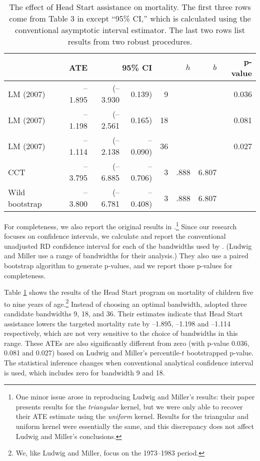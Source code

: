 \documentclass[12pt,fleqn]{article}
\begin{document}
\begin{table}[t]
  \centering
  \begin{tabular}{lrr@{, }rr@{}rrr}
    \toprule
                      & ATE     & \multicolumn{2}{r}{95\% CI}            &     &  $h$ &   $b$ & p-value \\
    \midrule
    LM (2007)         & --1.895 & (--3.930                    & 0.139)   & 9   &      &       & 0.036 \\
    LM (2007)         & --1.198 & (--2.561                    & 0.165)   & 18  &      &       & 0.081 \\
    LM (2007)         & --1.114 & (--2.138                    & --0.090) & 36  &      &       & 0.027 \\
    CCT               & --3.795 & (--6.885                    & --0.706) & 3   & .888 & 6.807 &       \\ 
    Wild bootstrap    & --3.800 & (--6.781                    & --0.408) & 3   & .888 & 6.807 &       \\
    \bottomrule
  \end{tabular}
  \caption{The effect of Head Start assistance on mortality. The first three
    rows come from Table 3 in \cite{ludwig2007} except ``95\% CI,'' which is
    calculated using the conventional asymptotic interval estimator.
    The last two rows list results from two robust procedures.}
  \label{tbl:2}
\end{table}

For completeness, we also report the
original results in \cite{ludwig2007}.\footnote{%
  One minor issue arose in reproducing Ludwig and Miller's results: their paper
  presents results for the \emph{triangular} kernel, but we were only able to
  recover their ATE estimate using the \emph{uniform} kernel. Results for the
  triangular and uniform kernel were essentially the same, and this discrepancy
  does not affect Ludwig and Miller's conclusions.} %
Since our research focuses on confidence intervals, we calculate and report
the conventional unadjusted RD confidence interval for each of the bandwidths
used by \cite{ludwig2007}. (Ludwig and Miller use a range of bandwidths
for their analysis.) They also use a paired bootstrap algorithm to generate
p-values, and we report those p-values for completeness.

Table \ref{tbl:2} shows the results of the Head Start program on mortality of
children five to nine years of age.\footnote{%
  We, like Ludwig and Miller, focus on the 1973--1983 period.} %
Instead of choosing an optimal bandwidth, \cite{ludwig2007} adopted three
candidate bandwidths 9, 18, and 36. Their estimates indicate that Head Start
assistance lowers the targeted mortality rate by --1.895, --1.198 and --1.114
respectively, which are not very sensitive to the choice of bandwidths in this
range. These ATEs are also significantly different from zero (with p-value
0.036, 0.081 and 0.027) based on Ludwig and Miller's percentile-$t$ bootstrapped
p-value. The statistical inference changes when conventional analytical
confidence interval is used, which includes zero for bandwidth 9 and 18.
\end{document}
